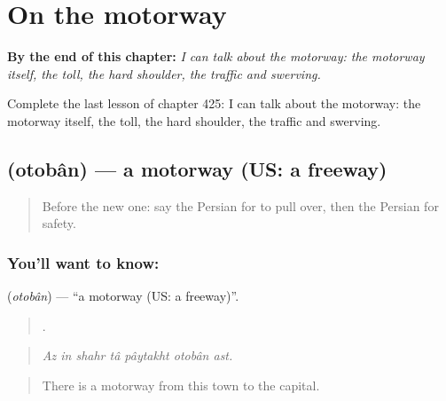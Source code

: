 
\chapter{On the motorway}
\label{ch:fa-on-the-motorway}

\begin{chapteropening}
\textbf{By the end of this chapter:} \emph{I can talk about the motorway: the motorway itself, the toll, the hard shoulder, the traffic and swerving.}

Complete the last lesson of chapter 425: I can talk about the motorway: the motorway itself, the toll, the hard shoulder, the traffic and swerving.
\end{chapteropening}

\section[\texorpdfstring{\fa{اتوبان} (otobân)}{اتوبان (otobân)}]{ (otobân) — a motorway (US: a freeway)}

\label{lesson:FA-C425-otoban}



\begin{quote}
Before the new one: say the Persian for to pull over, then the Persian for safety.
\end{quote}

\subsection*{You'll want to know: }
\textbf{} (\emph{otobân}) — \textquotedblleft{}a motorway (US: a freeway)\textquotedblright{}.

\begin{quote}
      .
\end{quote}

\begin{quote}
\emph{Az in shahr tâ pâytakht otobân ast.}
\end{quote}

\begin{quote}
There is a motorway from this town to the capital.
\end{quote}


